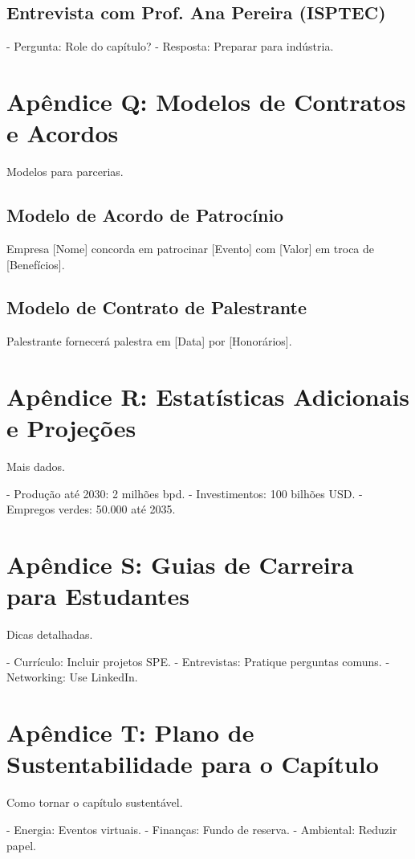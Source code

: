 \documentclass[12pt]{article}
\begin{document}
\subsection{Entrevista com Prof. Ana Pereira (ISPTEC)}
- Pergunta: Role do capítulo?
- Resposta: Preparar para indústria.

\section{Apêndice Q: Modelos de Contratos e Acordos}

Modelos para parcerias.

\subsection{Modelo de Acordo de Patrocínio}
Empresa [Nome] concorda em patrocinar [Evento] com [Valor] em troca de [Benefícios].

\subsection{Modelo de Contrato de Palestrante}
Palestrante fornecerá palestra em [Data] por [Honorários].

\section{Apêndice R: Estatísticas Adicionais e Projeções}

Mais dados.

- Produção até 2030: 2 milhões bpd.
- Investimentos: 100 bilhões USD.
- Empregos verdes: 50.000 até 2035.

\section{Apêndice S: Guias de Carreira para Estudantes}

Dicas detalhadas.

- Currículo: Incluir projetos SPE.
- Entrevistas: Pratique perguntas comuns.
- Networking: Use LinkedIn.

\section{Apêndice T: Plano de Sustentabilidade para o Capítulo}

Como tornar o capítulo sustentável.

- Energia: Eventos virtuais.
- Finanças: Fundo de reserva.
- Ambiental: Reduzir papel.
\end{document}
